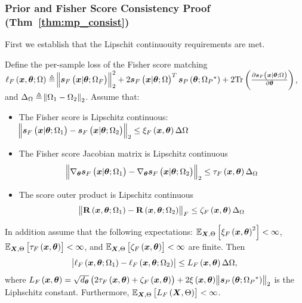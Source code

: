 \subsubsection{Prior and Fisher Score Consistency Proof (Thm~\ref{thm:mp_consist})}
First we 
establish %
that the Lipschit continuouity requirements are met. %
\begin{lemma}\label{lemma:lip_score_fisher}
        {Define the per-sample loss of the Fisher score matching $\ell_F\left(\bm{x},\bm{\theta};\Omega\right)\triangleq \norm{\bm{s}_{F}\left({\bm{x}}|\bm{\theta};\Omega_{F}\right)}_2^2
    +2\bm{s}_{F}\left({\bm{x}}|\bm{\theta};\Omega\right)^T\bm{s}_{P}\left(\bm{\theta};\Omega_{P}{^*}\right)+2\mathrm{Tr}\left(\frac{\partial \bm{s}_{F}\left({\bm{x}}|\bm{\theta};\Omega\right)}{\partial\bm{\theta}}\right) $, and $\Delta_\Omega \triangleq  \norm{\Omega_{1}-\Omega_{2}}_2$. }
    Assume that: 
    \begin{itemize}
        \item  The Fisher score is  Lipschitz continuous:
        $\norm{\bm{s}_{F}\left(\bm{x}|\bm{\theta};\Omega_1\right)-\bm{s}_{F}\left(\bm{x}|\bm{\theta};\Omega_2\right)}_2\leq \xi_{F}\left(\bm{x},\bm{\theta}\right)\Delta\Omega$
      \item {The Fisher} score {Jacobian matrix} is Lipschitz continuous 
      $$\norm{\nabla_{\bm{\theta}}\bm{s}_{F}\left(\bm{x}|\bm{\theta};\Omega_1\right)-\nabla_{\bm{\theta}}\bm{s}_{F}\left(\bm{x}|\bm{\theta};\Omega_2\right)}_2\leq \tau_F\left(\bm{x},\bm{\theta}\right)\Delta_\Omega$$
      \item {The score} outer product is Lipschitz continuous
      $$\norm{\mathbf{R}\left(\bm{x},\bm{\theta};\Omega_1\right)-\mathbf{R}\left(\bm{x},\bm{\theta};\Omega_2\right)}_F\leq \zeta_F\left(\bm{x},\bm{\theta}\right)\Delta_\Omega$$
  \end{itemize}
  In addition assume that the following expectations: $\expectation{\xi_F\brackets{\x,\p}^2}{\X,\pr}<\infty$, $\expectation{\tau_F\brackets{\x,\p}}{\X,\pr}<\infty$,  and  $\expectation{\zeta_F\brackets{\x,\p}}{\X,\pr}<\infty$ are finite.
    Then
    \begin{equation}
        \abs{\ell_F\left(\bm{x},\bm{\theta};\Omega_{1}\right)-\ell_F\left(\bm{x},\bm{\theta};\Omega_{2}\right)}\leq L_F\left(\bm{x},\bm{\theta}\right)\Delta\Omega,
    \end{equation}
    where $L_F\left(\bm{x},\bm{\theta}\right)=\sqrt{{d_{\bm{\theta}}}}\left(2\tau_F\left(\bm{x},\bm{\theta}\right)+\zeta_F\left(\bm{x},\bm{\theta}\right)\right)+2\xi\left(\bm{x},\bm{\theta}\right)\norm{\bm{s}_{P}\left(\bm{\theta};\Omega_{P}{^*}\right)}_2$ is the Liphschitz constant. {Furthermore, $\expectation{L_F\brackets{\X,\pr}}{\X,\pr}<\infty$. }
\end{lemma}
